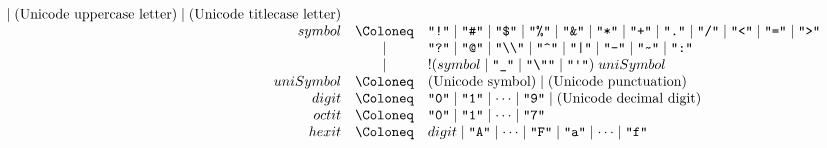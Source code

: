 \begin{align*}
\begin{array}{rcl}
    \mid (\text{Unicode uppercase letter})
    \mid (\text{Unicode titlecase letter})
    \\
    {symbol}
    & \Coloneq & \text{\texttt{\textquotedbl!\textquotedbl}}
    \mid \text{\texttt{\textquotedbl\#\textquotedbl}}
    \mid \text{\texttt{\textquotedbl\$\textquotedbl}}
    \mid \text{\texttt{\textquotedbl\%\textquotedbl}}
    \mid \text{\texttt{\textquotedbl\&\textquotedbl}}
    \mid \text{\texttt{\textquotedbl *\textquotedbl}}
    \mid \text{\texttt{\textquotedbl +\textquotedbl}}
    \mid \text{\texttt{\textquotedbl .\textquotedbl}}
    \mid \text{\texttt{\textquotedbl /\textquotedbl}}
    \mid \text{\texttt{\textquotedbl <\textquotedbl}}
    \mid \text{\texttt{\textquotedbl =\textquotedbl}}
    \mid \text{\texttt{\textquotedbl >\textquotedbl}}
    \\
    & \mid & \text{\texttt{\textquotedbl ?\textquotedbl}}
    \mid \text{\texttt{\textquotedbl @\textquotedbl}}
    \mid \text{\texttt{\textquotedbl\textbackslash\textbackslash\textquotedbl}}
    \mid \text{\texttt{\textquotedbl\textasciicircum\textquotedbl}}
    \mid \text{\texttt{\textquotedbl |\textquotedbl}}
    \mid \text{\texttt{\textquotedbl -\textquotedbl}}
    \mid \text{\texttt{\textquotedbl\textasciitilde\textquotedbl}}
    \mid \text{\texttt{\textquotedbl :\textquotedbl}}
    \\
    & \mid & ! ({symbol} \mid \text{\texttt{\textquotedbl\textunderscore\textquotedbl}} \mid \text{\texttt{\textquotedbl\textbackslash\textquotedbl\textquotedbl}} \mid \text{\texttt{\textquotedbl\textquotesingle\textquotedbl}})\; {uniSymbol}
    \\
    {uniSymbol}
    & \Coloneq & (\text{Unicode symbol})
    \mid (\text{Unicode punctuation})
    \\
    {digit}
    & \Coloneq & \text{\texttt{\textquotedbl0\textquotedbl}} \mid \text{\texttt{\textquotedbl1\textquotedbl}} \mid \cdots \mid \text{\texttt{\textquotedbl9\textquotedbl}}
    \mid (\text{Unicode decimal digit})
    \\
    {octit}
    & \Coloneq & \text{\texttt{\textquotedbl0\textquotedbl}} \mid \text{\texttt{\textquotedbl1\textquotedbl}} \mid \cdots \mid \text{\texttt{\textquotedbl7\textquotedbl}}
    \\
    {hexit}
    & \Coloneq & {digit}
    \mid \text{\texttt{\textquotedbl A\textquotedbl}} \mid \cdots \mid \text{\texttt{\textquotedbl F\textquotedbl}}
    \mid \text{\texttt{\textquotedbl a\textquotedbl}} \mid \cdots \mid \text{\texttt{\textquotedbl f\textquotedbl}}
    \\

\end{array}
\end{align*}
